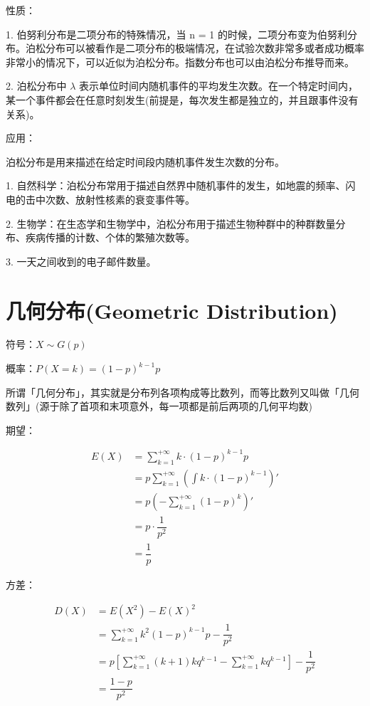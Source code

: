 \documentclass[12pt, a4paper, oneside]{ctexbook}
\begin{document}
性质：

1. 伯努利分布是二项分布的特殊情况，当 n = 1 的时候，二项分布变为伯努利分布。泊松分布可以被看作是二项分布的极端情况，在试验次数非常多或者成功概率非常小的情况下，可以近似为泊松分布。指数分布也可以由泊松分布推导而来。

2. 泊松分布中 $\lambda$ 表示单位时间内随机事件的平均发生次数。在一个特定时间内，某一个事件都会在任意时刻发生(前提是，每次发生都是独立的，并且跟事件没有关系)。

应用：

泊松分布是用来描述在给定时间段内随机事件发生次数的分布。

1. 自然科学：泊松分布常用于描述自然界中随机事件的发生，如地震的频率、闪电的击中次数、放射性核素的衰变事件等。

2. 生物学：在生态学和生物学中，泊松分布用于描述生物种群中的种群数量分布、疾病传播的计数、个体的繁殖次数等。

3. 一天之间收到的电子邮件数量。

\section{几何分布(Geometric Distribution)}

 符号：$X\sim G(p)$

 概率：$P(X = k) = (1-p)^{k - 1}p$

所谓「几何分布」，其实就是分布列各项构成等比数列，而等比数列又叫做「几何数列」(源于除了首项和末项意外，每一项都是前后两项的几何平均数)

 期望：

\begin{align*}
E(X) &= \sum\limits_{k = 1}^{+\infty} k \cdot (1-p)^{k - 1}p \\
&=p \sum\limits_{k = 1}^{+\infty} \left( \int k \cdot (1-p)^{k - 1}\right)' \\
&= p \left(-\sum\limits_{k = 1}^{+\infty}(1-p)^{k} \right)' \\
&= p \cdot \dfrac{1}{p^{2}} \\
&= \dfrac{1}{p}
\end{align*}

 方差：


\begin{align*}
D(X) &= E(X^{2}) - E(X)^{2} \\
&= \sum\limits_{k = 1}^{+\infty} k^{2}(1 - p)^{k - 1}p - \dfrac{1}{p^{2}} \\
&= p \left[\sum\limits_{k = 1}^{+\infty}(k+ 1)kq^{k - 1} - \sum\limits_{k = 1}^{+\infty} kq^{k - 1} \right] - \dfrac{1}{p^{2}} \\
&= \dfrac{1 - p}{p^{2}}
\end{align*}
\end{document}
